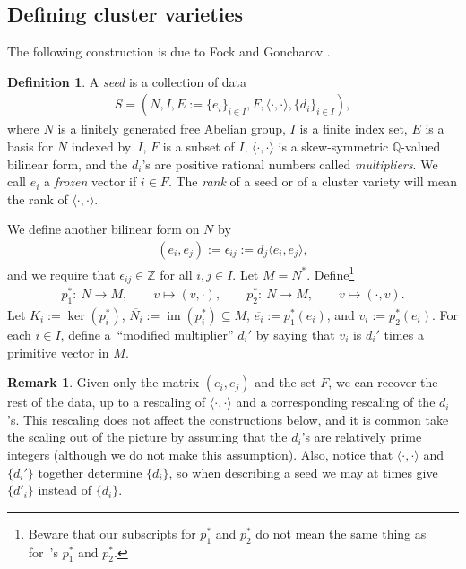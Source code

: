 \documentclass[11pt]{article}
\numberwithin{equation}{section}
\numberwithin{figure}{section}
\numberwithin{table}{section}
\DeclareMathOperator{\im}{im}
\let\?=\overline
\let\bb=\mathbb
\let\rar=\rightarrow
\theoremstyle{definition}
\newtheorem{dfn}[thm]{Definition}
\newtheorem{rmk}[thm]{Remark}
\begin{document}
\subsection{Defining cluster varieties}\label{ClusterDefs}
The following construction is due to Fock and Goncharov \cite{FG1}.

\begin{dfn}A {\it seed} is a collection of data
\begin{gather*} S=(N,I,E:=\{e_i\}_{i\in I},F,\langle\cdot,\cdot\rangle,\{d_i\}_{i\in I}),\end{gather*}
where $N$ is a finitely generated free Abelian group, $I$ is a finite index set, $E$ is a basis for $N$ indexed by~$I$, $F$ is a subset of $I$, $\langle \cdot,\cdot\rangle$ is a skew-symmetric $\bb{Q}$-valued bilinear form, and the $d_i$'s are positive rational numbers called {\it multipliers}. We call $e_i$ a {\it frozen} vector if $i \in F$. The {\it rank} of a seed or of a cluster variety will mean the rank of $\langle \cdot, \cdot \rangle$.

We define another bilinear form on $N$ by
\begin{gather*} (e_i,e_j):=\epsilon_{ij}:=d_j\langle e_i,e_j \rangle,\end{gather*} and we require that $\epsilon_{ij}\in \bb{Z}$ for all $i,j\in I$.
 Let $M=N^*$. Define\footnote{Beware that our subscripts for $p_1^*$ and $p_2^*$ do not mean the same thing as for~\cite{GHK3}'s $p_1^*$ and $p_2^*$.}
 \begin{gather*} p_1^*\colon \ N\rar M,\qquad v\mapsto (v,\cdot), \qquad p_2^*\colon \ N\rar M,\qquad v\mapsto (\cdot,v).
 \end{gather*} Let $K_i:= \ker (p_i^*)$, $\?{N_i} := \im(p_i^*)\subseteq M$, $\?{e_i}:=p_1^*(e_i)$, and $v_i:=p_2^*(e_i)$. For each $i\in I$, define a~``modified multiplier'' $d_i'$ by saying that $v_i$ is $d_i'$ times a primitive vector in $M$.
\end{dfn}

\begin{rmk}\label{determined}Given only the matrix $(e_i,e_j)$ and the set $F$, we can recover the rest of the data, up to a rescaling of $\langle \cdot,\cdot\rangle$ and a corresponding rescaling of the $d_i$'s. This rescaling does not affect the constructions below, and it is common take the scaling out of the picture by assuming that the $d_i$'s are relatively prime integers (although we do not make this assumption). Also, notice that $\langle\cdot,\cdot\rangle$ and $\{d_i'\}$ together determine $\{d_i\}$, so when describing a seed we may at times give $\{d'_i\}$ instead of $\{d_i\}$.
\end{rmk}
\end{document}

